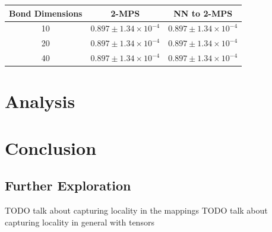 \documentclass{article}
\theoremstyle{definition}
\theoremstyle{definition}
\begin{document}
\begin{tabular}{| c | c | c |}
\hline 
Bond Dimensions & 2-MPS & NN to 2-MPS \\ 
\hline
10 & $0.897 \pm 1.34 \times 10^{-4}$ & $0.897 \pm 1.34 \times 10^{-4}$ \\
20 & $0.897 \pm 1.34 \times 10^{-4}$ & $0.897 \pm 1.34 \times 10^{-4}$ \\
40 & $0.897 \pm 1.34 \times 10^{-4}$ & $0.897 \pm 1.34 \times 10^{-4}$ \\
\hline
\end{tabular}

\section{Analysis}



\section{Conclusion}



\subsection{Further Exploration}
TODO talk about capturing locality in the mappings
TODO talk about capturing locality in general with tensors

\printbibliography
\end{document}
